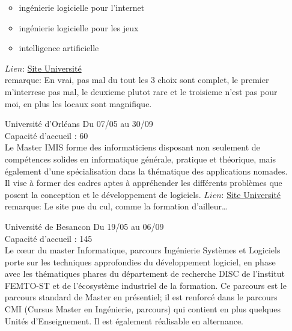 \documentclass[a4paper,11pt]{article}
\begin{document}
\begin{enumerate}
                \begin{itemize}
                    \item ingénierie logicielle pour l'internet
                    \item ingénierie logicielle pour les jeux
                    \item intelligence artificielle
                \end{itemize}
                $Lien$: \href{http://informatique.univ-artois.fr/master/}{Site Université}
                \\remarque: En vrai, pas mal du tout les 3 choix sont complet, le premier m'interrese pas mal, le deuxieme plutot rare et le troisieme n'est pas pour moi, en plus les locaux sont magnifique.
\\
        \item [\color{LightOrangeHaf}Université d'Orléans] Du 07/05 au 30/09
                \\Capacité d'accueil : 60
                \\Le Master IMIS forme des informaticiens disposant non seulement de compétences solides en informatique générale, pratique et théorique, mais également d'une spécialisation dans la thématique des applications nomades. Il vise à former des cadres aptes à appréhender les différents problèmes que posent la conception et le développement de logiciels.
                $Lien$: \href{https://formation.univ-orleans.fr/fr/formation/offre-de-formation/master-lmd-XB/sciences-technologies-sante-STS/master-informatique-parcours-informatique-mobile-intelligente-et-securisee-imis-program-espm2mt-514-2-3-2-2-2-2-2-2.html?univorleans}{Site Université}
                \\remarque: Le site pue du cul, comme la formation d'ailleur\ldots
\\
        \item [\color{LightOrangeHaf}Université de Besancon] Du 19/05 au 06/09
                \\Capacité d'accueil : 145
                \\Le cœur du master Informatique, parcours Ingénierie Systèmes et Logiciels porte sur les techniques approfondies du développement logiciel, en phase avec les thématiques phares du département de recherche DISC de l'institut FEMTO-ST et de l'écosystème industriel de la formation. Ce parcours est le parcours standard de Master en présentiel; il est renforcé dans le parcours CMI (Cursus Master en Ingénierie, parcours) qui contient en plus quelques Unités d'Enseignement. Il est également réalisable en alternance.

\end{enumerate}
\end{document}

